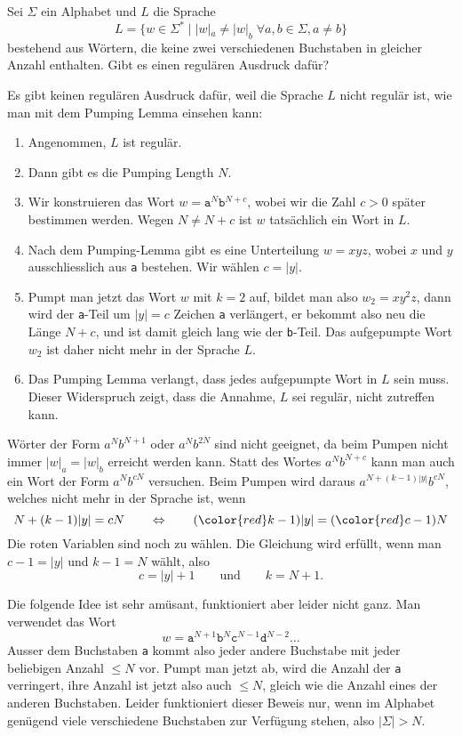 Sei $\Sigma$ ein Alphabet und $L$ die Sprache
\[
L=\{ w\in\Sigma^* \;|\; |w|_a \ne |w|_b\;\forall a,b\in\Sigma, a\ne b\}
\]
bestehend aus Wörtern, die keine zwei verschiedenen Buchstaben in gleicher
Anzahl enthalten.
Gibt es einen regulären Ausdruck dafür?


\begin{loesung}
Es gibt keinen regulären Ausdruck dafür, weil die Sprache $L$ nicht regulär
ist, wie man mit dem Pumping Lemma einsehen kann:
\begin{enumerate}
\item Angenommen, $L$ ist regulär.
\item Dann gibt es die Pumping Length $N$.
\item Wir konstruieren das Wort $w=\texttt{a}^N\texttt{b}^{N+c}$, wobei
wir die Zahl $c>0$ später bestimmen werden.
Wegen $N\ne N+c$ ist $w$ tatsächlich ein Wort in $L$.
\item Nach dem Pumping-Lemma gibt es eine Unterteilung $w=xyz$, wobei
$x$ und $y$ ausschliesslich aus \texttt{a} bestehen.
Wir wählen $c=|y|$.
\item Pumpt man jetzt das Wort $w$ mit $k=2$ auf, bildet man also
$w_2=xy^2z$, dann wird der \texttt{a}-Teil um $|y|=c$ Zeichen \texttt{a}
verlängert, er bekommt also neu die Länge $N+c$, und ist damit gleich
lang wie der \texttt{b}-Teil.
Das aufgepumpte Wort $w_2$ ist daher nicht mehr in der Sprache $L$.
\item Das Pumping Lemma verlangt, dass jedes aufgepumpte Wort in $L$
sein muss.
Dieser Widerspruch zeigt, dass die Annahme, $L$ sei regulär, nicht
zutreffen kann.
\qedhere
\end{enumerate}
\end{loesung}

\begin{diskussion}
Wörter der Form $a^Nb^{N+1}$ oder $a^Nb^{2N}$ sind nicht geeignet, da
beim Pumpen nicht immer $|w|_a=|w|_b$ erreicht werden kann.
Statt des Wortes $a^Nb^{N+c}$ kann man auch ein Wort der Form $a^Nb^{cN}$
versuchen.
Beim Pumpen wird daraus
$a^{N+(k-1)|y|}b^{cN}$, welches nicht mehr in der Sprache ist, wenn
\[
N+(k-1)|y|=cN
\qquad\Leftrightarrow\qquad
({\color{red}k}-1)|y|=({\color{red}c}-1)N
\]
Die {\color{red}roten} Variablen sind noch zu wählen.
Die Gleichung wird erfüllt, wenn man $c-1=|y|$ und $k-1=N$ wählt, also
\[
c=|y|+1\qquad\text{und}\qquad k=N+1.
\]

Die folgende Idee ist sehr amüsant, funktioniert aber leider nicht ganz.
Man verwendet das Wort
\[
w=\texttt{a}^{N+1}\texttt{b}^N\texttt{c}^{N-1}\texttt{d}^{N-2}\dots
\]
Ausser dem Buchstaben \texttt{a} kommt also jeder andere Buchstabe
mit jeder beliebigen Anzahl $\le N$ vor. 
Pumpt man jetzt ab, wird die Anzahl der \texttt{a} verringert, ihre
Anzahl ist jetzt also auch $\le N$, gleich wie die Anzahl eines der
anderen Buchstaben.
Leider funktioniert dieser Beweis nur, wenn im Alphabet genügend viele
verschiedene Buchstaben zur Verfügung stehen, also $|\Sigma| > N$.
\end{diskussion}

